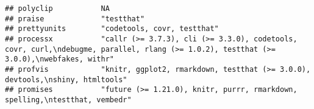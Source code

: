 \documentclass[
]{article}
\begin{document}
\begin{verbatim}
## polyclip           NA                                                                                                                                                                                                                                                                                                                                                                                                                                                                                
## praise             "testthat"                                                                                                                                                                                                                                                                                                                                                                                                                                                                        
## prettyunits        "codetools, covr, testthat"                                                                                                                                                                                                                                                                                                                                                                                                                                                       
## processx           "callr (>= 3.7.3), cli (>= 3.3.0), codetools, covr, curl,\ndebugme, parallel, rlang (>= 1.0.2), testthat (>= 3.0.0),\nwebfakes, withr"                                                                                                                                                                                                                                                                                                                                            
## profvis            "knitr, ggplot2, rmarkdown, testthat (>= 3.0.0), devtools,\nshiny, htmltools"                                                                                                                                                                                                                                                                                                                                                                                                     
## promises           "future (>= 1.21.0), knitr, purrr, rmarkdown, spelling,\ntestthat, vembedr"                                                                                                                                                                                                                                                                                                                                                                                                       

\end{verbatim}
\end{document}
